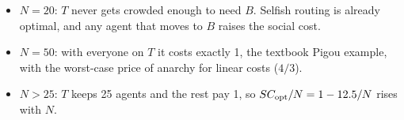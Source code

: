 \documentclass[11pt]{article}
\begin{document}
\begin{itemize}
  \item $N = 20$: $T$ never gets crowded enough to need $B$. Selfish routing is already optimal, and any
        agent that moves to $B$ raises the social cost.
  \item $N = 50$: with everyone on $T$ it costs exactly 1, the textbook Pigou example, with the worst-case
        price of anarchy for linear costs ($4/3$).
  \item $N > 25$: $T$ keeps 25 agents and the rest pay 1, so $SC_{\mathrm{opt}}/N = 1 - 12.5/N$ rises with $N$.
\end{itemize}
\end{document}
